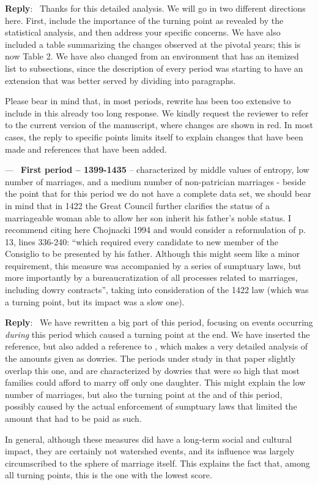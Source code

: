 \documentclass[11pt]{article}
\newcounter{reviewer}
\newcounter{point}[reviewer]
\renewcommand{\thepoint}{P\,\thereviewer.\arabic{point}}
\newenvironment{point}
   {\refstepcounter{point} \bigskip \noindent {\textbf{Reviewer~Point~\thepoint} } ---\ }
   {\par }
\newenvironment{reply}
   {\medskip \noindent \begin{sf}\textbf{Reply}:\  }
   {\medskip \end{sf}}
\begin{document}
\begin{reply}
  Thanks for this detailed analysis. We will go in two different directions
  here. First, include the importance of the turning point as revealed by the
  statistical analysis, and then address your specific concerns. We have also
  included a table summarizing the changes observed at the pivotal years; this
  is now Table 2. We have also changed from an environment that has an itemized
  list to subsections, since the description of every period was starting to
  have an extension that was better served by dividing into paragraphs.

  Please bear in mind that, in most periods, rewrite has been too extensive to
  include in this already too long response. We kindly request the reviewer to
  refer to the current version of the manuscript, where changes are shown in
  red. In most cases, the reply to specific points limits itself to explain
  changes that have been made and references that have been added.
\end{reply}

\begin{point}
  {\bf First period – 1399-1435} – characterized by middle values of entropy,
  low number of marriages, and a medium number of non-patrician marriages -
  beside the point that for this period we do not have a complete data set, we
  should bear in mind that in 1422 the Great Council further clarifies the
  status of a marriageable woman able to allow her son inherit his father’s
  noble status. I recommend citing here Chojnacki 1994 and would consider a
  reformulation of p. 13, lines 336-240: “which required every candidate to new
  member of the Consiglio to be presented by his father. Although this might
  seem like a minor requirement, this measure was accompanied by a series of
  sumptuary laws, but more importantly by a bureaucratization of all processes
  related to marriages, including dowry contracts”, taking into consideration of
  the 1422 law (which was a turning point, but its impact was a slow one).
\end{point}

\begin{reply}
We have rewritten a big part of this period, focusing on events occurring {\em
  during} this period which caused a turning point at the end. We have inserted
the reference, but also added a reference to \cite{10.2307/202860}, which makes
a very detailed analysis of the amounts given as dowries. The periods under
study in that paper slightly overlap this one, and are characterized by dowries
that were so high that most families could afford to marry off only one
daughter. This might explain the low number of marriages, but also the turning
point at the and of this period, possibly caused by the actual enforcement of
sumptuary laws that limited the amount that had to be paid as such.

In general, although these measures did have a long-term social and cultural
impact, they are certainly not watershed events, and its influence was largely
circumscribed to the sphere of marriage itself. This explains the fact that,
among all turning points, this is the one with the lowest score.
\end{reply}
\end{document}
